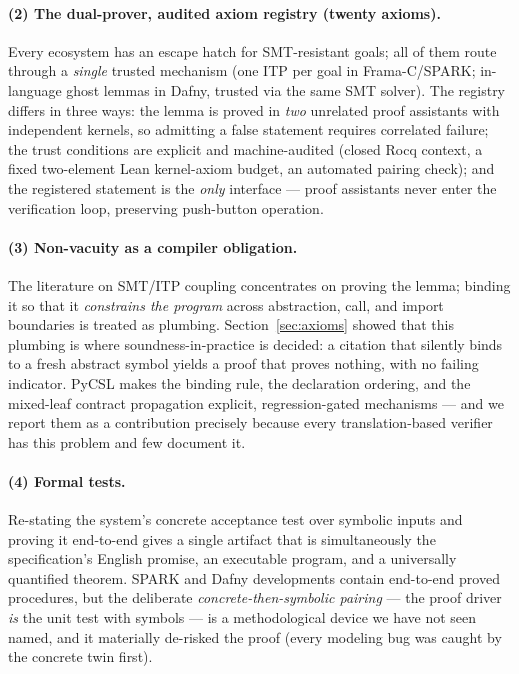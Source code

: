 \documentclass[11pt]{article}
\newcommand{\pycsl}{\textsf{PyCSL}}
\newcommand{\rocq}{\textsf{Rocq}}
\newcommand{\lean}{\textsf{Lean}}
\begin{document}
\paragraph{(2) The dual-prover, audited axiom registry (twenty axioms).}
Every ecosystem has an escape hatch for SMT-resistant goals; all of them
route through a \emph{single} trusted mechanism (one ITP per goal in
Frama-C/SPARK; in-language ghost lemmas in Dafny, trusted via the same SMT
solver). The registry differs in three ways: the lemma is proved in
\emph{two} unrelated proof assistants with independent kernels, so admitting
a false statement requires correlated failure; the trust conditions are
explicit and machine-audited (closed \rocq{} context, a fixed two-element
\lean{} kernel-axiom budget, an automated pairing check); and the registered
statement is the \emph{only} interface --- proof assistants never enter the
verification loop, preserving push-button operation.

\paragraph{(3) Non-vacuity as a compiler obligation.}
The literature on SMT/ITP coupling concentrates on proving the lemma;
binding it so that it \emph{constrains the program} across abstraction,
call, and import boundaries is treated as plumbing. Section~\ref{sec:axioms}
showed that this plumbing is where soundness-in-practice is decided: a
citation that silently binds to a fresh abstract symbol yields a proof that
proves nothing, with no failing indicator. \pycsl{} makes the binding rule,
the declaration ordering, and the mixed-leaf contract propagation explicit,
regression-gated mechanisms --- and we report them as a contribution
precisely because every translation-based verifier has this problem and few
document it.

\paragraph{(4) Formal tests.}
Re-stating the system's concrete acceptance test over symbolic inputs and
proving it end-to-end gives a single artifact that is simultaneously the
specification's English promise, an executable program, and a universally
quantified theorem. SPARK and Dafny developments contain end-to-end proved
procedures, but the deliberate \emph{concrete-then-symbolic pairing} --- the
proof driver \emph{is} the unit test with symbols --- is a methodological
device we have not seen named, and it materially de-risked the proof (every
modeling bug was caught by the concrete twin first).
\end{document}
